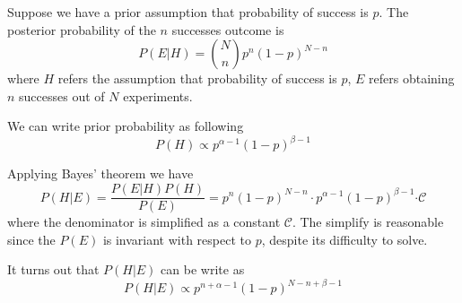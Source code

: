 \documentclass[a4paper]{article}
\begin{document}
Suppose we have a prior assumption that probability of success is $p$.
The posterior probability of the $n$ successes outcome is
\begin{equation}
    P(E|H) = \binom{N}{n} p^n (1-p)^{N-n}
\end{equation}
where $H$ refers the assumption that probability of success is $p$, $E$ refers obtaining $n$ successes out of $N$ experiments.

We can write prior probability as following
\begin{equation}
    P(H) \propto p^{\alpha-1} (1-p)^{\beta-1}
\end{equation}

Applying Bayes' theorem we have
\begin{equation}
    P(H|E) = \frac{P(E|H) P(H)}{P(E)} = p^n (1-p)^{N-n} \cdot p^{\alpha-1} (1-p)^{\beta-1} \mathcal \cdot \mathcal{C}
\end{equation}
where the denominator is simplified as a constant $\mathcal{C}$. The simplify is reasonable since the $P(E)$ is invariant with respect to $p$, despite its difficulty to solve.

It turns out that $P(H|E)$ can be write as
\begin{equation}
    P(H|E) \propto p^{n + \alpha - 1} (1-p)^{N - n + \beta - 1}
\end{equation}
\end{document}
